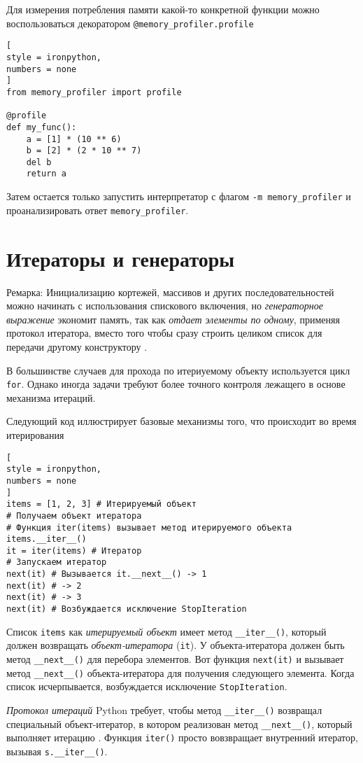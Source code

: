 \documentclass[%
	11pt,
	a4paper,
	utf8,
		]{article}
\begin{document}
Для измерения потребления памяти какой-то конкретной функции можно воспользоваться декоратором \texttt{@memory\_profiler.profile}
\begin{lstlisting}[
style = ironpython,
numbers = none
]
from memory_profiler import profile

@profile
def my_func():
    a = [1] * (10 ** 6)
    b = [2] * (2 * 10 ** 7)
    del b
    return a
\end{lstlisting}

Затем остается только запустить интерпретатор с флагом \verb|-m memory_profiler| и проанализировать ответ \texttt{memory\_profiler}.


\section{Итераторы и генераторы}

Ремарка: Инициализацию кортежей, массивов и других последовательностей можно начинать с использования спискового включения, но \emph{генераторное выражение} экономит память, так как \emph{отдает элементы по одному}, применяя протокол итератора, вместо того чтобы сразу строить целиком список для передачи другому конструктору \cite[]{ramalho:python-2022}.

В большинстве случаев для прохода по итериуемому объекту используется цикл \texttt{for}. Однако иногда задачи требуют более точного контроля лежащего в основе механизма итераций. 

Следующий код иллюстрирует базовые механизмы того, что происходит во время итерирования
\begin{lstlisting}[
style = ironpython,
numbers = none
]
items = [1, 2, 3] # Итерируемый объект
# Получаем объект итератора
# Функция iter(items) вызывает метод итерируемого объекта items.__iter__()
it = iter(items) # Итератор
# Запускаем итератор
next(it) # Вызывается it.__next__() -> 1
next(it) # -> 2
next(it) # -> 3
next(it) # Возбуждается исключение StopIteration
\end{lstlisting}

Список \texttt{items} как \emph{итерируемый объект} имеет метод \verb|__iter__()|, который должен возвращать \emph{объект-итератора} (\texttt{it}). У объекта-итератора должен быть метод \verb|__next__()| для перебора элементов. Вот функция \texttt{next(it)} и вызывает метод \verb|__next__()| объекта-итератора для получения следующего элемента. Когда список исчерпывается, возбуждается исключение \texttt{StopIteration}.

\emph{Протокол итераций} Python требует, чтобы метод \verb|__iter__()| возвращал специальный объект-итератор, в котором реализован метод \verb|__next__()|, который выполняет итерацию \cite[]{beazley:python_cookbook-2019}. Функция \texttt{iter()} просто вовзвращает внутренний итератор, вызывая \verb|s.__iter__()|.
\end{document}
